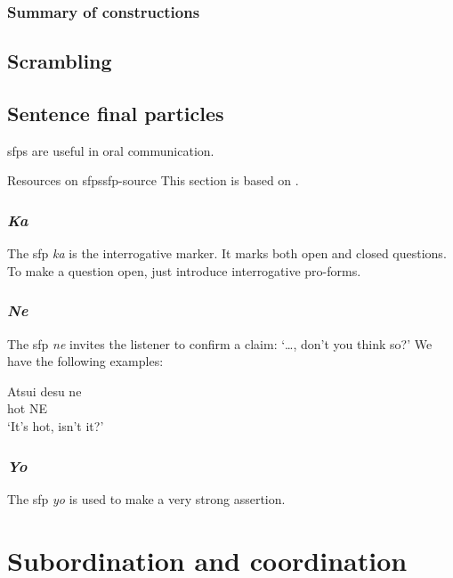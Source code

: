 \documentclass[UTF8, a4paper, oneside, scheme=plain]{ctexrep}
\newcommand*{\citesec}[1]{\S~{#1}}
\newcommand{\corpus}[1]{\emph{#1}}
\newcommand{\translate}[1]{`#1'}
\begin{document}
\subsection{Summary of constructions}\label{sec:wa-ga-template}

\section{Scrambling}\label{sec:scrambling}

\section{Sentence final particles}\label{sec:sfp}

\ac{sfp}s are useful in oral communication.

\begin{infobox}{Resources on \ac{sfp}s}{sfp-source}
    This section is based on \citet[\citesec{6.4}]{akiyama2012japanese}.
\end{infobox}

\subsection{\corpus{Ka}}

The \ac{sfp} \corpus{ka} is the interrogative marker.
It marks both open and closed questions.
To make a question open,
just introduce interrogative pro-forms.

\subsection{\corpus{Ne}}

The \ac{sfp} \corpus{ne} invites the listener to confirm a claim:
\translate{\dots, don't you think so?}
We have the following examples:
\begin{exe}
    \ex \gll Atsui desu ne  \\
    hot {} NE  \\
    \glt \translate{It's hot, isn't it?}
\end{exe}

\subsection{\corpus{Yo}}

The \ac{sfp} \corpus{yo} is used to make a very strong assertion.

\chapter{Subordination and coordination}
\end{document}
